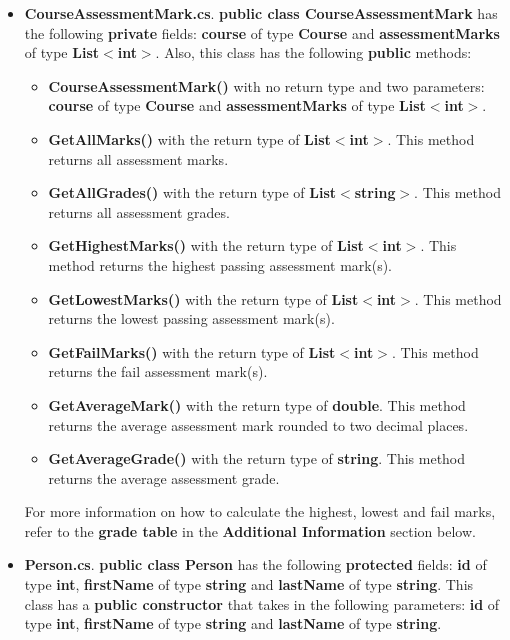 \documentclass{article}
\begin{document}
\begin{itemize}
\begin{itemize}
        \item \textbf{CourseAssessmentMark.cs}. \textbf{public class CourseAssessmentMark} has the following \textbf{private} fields: \textbf{course} of type \textbf{Course} and \textbf{assessmentMarks} of type \textbf{List$<$int$>$}. Also, this class has the following \textbf{public} methods:
        \begin{itemize}
            \item \textbf{CourseAssessmentMark()} with no return type and two parameters: \textbf{course} of type \textbf{Course} and \textbf{assessmentMarks} of type \textbf{List$<$int$>$}. 
            \item \textbf{GetAllMarks()} with the return type of \textbf{List$<$int$>$}. This method returns all assessment marks.
            \item \textbf{GetAllGrades()} with the return type of \textbf{List$<$string$>$}. This method returns all assessment grades.
            \item \textbf{GetHighestMarks()} with the return type of \textbf{List$<$int$>$}. This method returns the highest passing assessment mark(s).
            \item \textbf{GetLowestMarks()} with the return type of \textbf{List$<$int$>$}. This method returns the lowest passing assessment mark(s). 
            \item \textbf{GetFailMarks()} with the return type of \textbf{List$<$int$>$}. This method returns the fail assessment mark(s).
            \item \textbf{GetAverageMark()} with the return type of \textbf{double}. This method returns the average assessment mark rounded to two decimal places.
            \item \textbf{GetAverageGrade()} with the return type of \textbf{string}. This method returns the average assessment grade.
        \end{itemize}
        For more information on how to calculate the highest, lowest and fail marks, refer to the \textbf{grade table} in the \textbf{Additional Information} section below.
        \item \textbf{Person.cs}. \textbf{public class Person} has the following \textbf{protected} fields: \textbf{id} of type \textbf{int}, \textbf{firstName} of type \textbf{string} and \textbf{lastName} of type \textbf{string}. This class has a \textbf{public constructor} that takes in the following parameters: \textbf{id} of type \textbf{int}, \textbf{firstName} of type \textbf{string} and \textbf{lastName} of type \textbf{string}.

\end{itemize}
\end{itemize}
\end{document}
